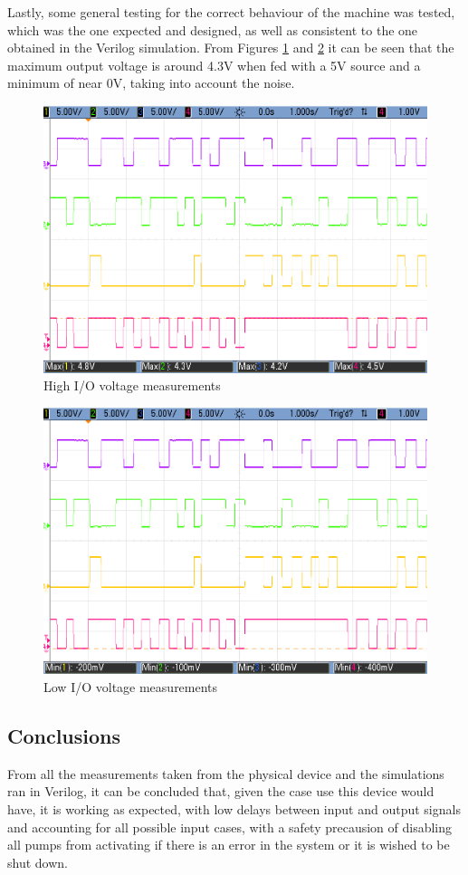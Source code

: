 Lastly, some general testing for the correct behaviour of the machine was tested, which was the one expected and
designed, as well as consistent to the one obtained in the Verilog simulation. From Figures \ref{fig:moore_max} and 
\ref{fig:moore_min} it can be seen that the maximum output voltage is around 4.3V when fed with a 5V source and a
minimum of near 0V, taking into account the noise.

\begin{figure}[ht]
    \begin{center}
        \includegraphics[width=0.75\linewidth]{images/e3e1_1s4i_2b1_2b2_v1.png}
        \caption{High I/O voltage measurements}
        \label{fig:moore_max}
    \end{center}
\end{figure}

\begin{figure}[ht]
    \begin{center}
        \includegraphics[width=0.75\linewidth]{images/e3e1_1s4i_2b1_2b2_v0.png}
        \caption{Low I/O voltage measurements}
        \label{fig:moore_min}
    \end{center}
\end{figure}

\newpage
\subsection{Conclusions}
From all the measurements taken from the physical device and the simulations ran in Verilog, it can be concluded
that, given the case use this device would have, it is working as expected, with low delays between input and
output signals and accounting for all possible input cases, with a safety precausion of disabling all pumps from
activating if there is an error in the system or it is wished to be shut down.